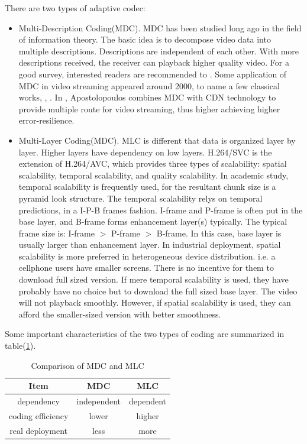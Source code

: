\documentclass[11pt,a4paper]{article}
\begin{document}
There are two types of adaptive codec:
\begin{itemize}
	\item Multi-Description Coding(MDC). MDC has been studied long ago 
	in the field of information theory\cite{gamal1982achievable}. The basic
	idea is to decompose video data into multiple descriptions. Descriptions
	are independent of each other. With more descriptions received, the 
	receiver can playback higher quality video. For a good survey, interested 
	readers are recommended to \cite{wang2005mdc}. Some application 
	of MDC in video streaming appeared around 2000, to name a few classical 
	works, \cite{apostolopoulos2001reliable}, \cite{apostolopoulos2002multiple}. 
	In \cite{apostolopoulos2002multiple}, Apostolopoulos combines MDC with 
	CDN technology to provide multiple route for video streaming, thus higher
	achieving higher error-resilience. 
	
	\item Multi-Layer Coding(MDC). MLC is different that data is organized 
	layer by layer. Higher layers have dependency on low layers. 
	H.264/SVC\cite{schwarz2007overview-svc} is the extension of 
	H.264/AVC\cite{wiegand2003overview-avc}, which provides three types of 
	scalability: spatial scalability, temporal scalability, and 
	quality scalability. In academic study, temporal scalability is 
	frequently used, for the resultant chunk size is a pyramid look 
	structure. The temporal scalability relys on temporal predictions, 
	in a I-P-B frames fashion. I-frame and P-frame is often put in 
	the base layer, and B-frame forms enhancement layer(s) typically. 
	The typical frame size is: I-frame $>$ P-frame $>$ B-frame. In this case, 
	base layer is usually larger than enhancement layer. In industrial 
	deployment, spatial scalability is more preferred in heterogeneous 
	device distribution. i.e. a cellphone users have smaller screens. 
	There is no incentive for them to download full sized version. 
	If mere temporal scalability is used, they have probably have no choice
	but to download the full sized base layer. The video will not playback 
	smoothly. However, if spatial scalability is used, they can afford 
	the smaller-sized version with better smoothness.  
\end{itemize}

Some important characteristics of the two types of coding 
are summarized in table(\ref{tbl:comp_mdc_mlc}). 
\begin{table}[htb]
\centering
\caption{Comparison of MDC and MLC}
\label{tbl:comp_mdc_mlc}
	\begin{tabular}{c|c|c}
		\hline
		Item & MDC & MLC \\
		\hline
		dependency & independent & dependent \\
		coding efficiency & lower & higher \\
		real deployment & less & more \\
		\hline
	\end{tabular}
\end{table}
\end{document}
